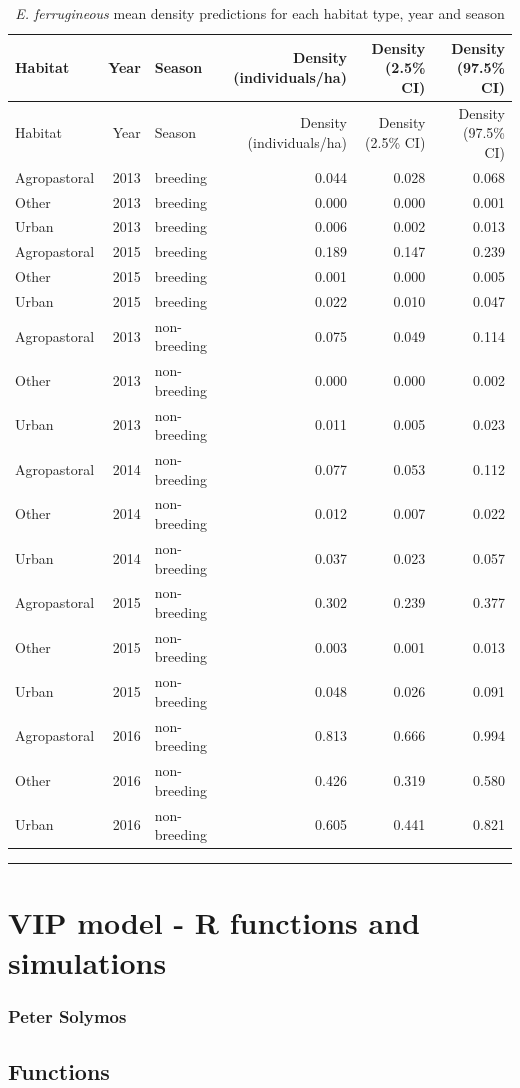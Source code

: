 \documentclass[]{article}
\begin{document}
\begin{longtable}[]{@{}lrlrrr@{}}
\caption{\textit{E. ferrugineous} mean density predictions for each
habitat type, year and season}\tabularnewline
\toprule
Habitat & Year & Season & Density (individuals/ha) & Density (2.5\% CI)
& Density (97.5\% CI)\tabularnewline
\midrule
\endfirsthead
\toprule
Habitat & Year & Season & Density (individuals/ha) & Density (2.5\% CI)
& Density (97.5\% CI)\tabularnewline
\midrule
\endhead
Agropastoral & 2013 & breeding & 0.044 & 0.028 & 0.068\tabularnewline
Other & 2013 & breeding & 0.000 & 0.000 & 0.001\tabularnewline
Urban & 2013 & breeding & 0.006 & 0.002 & 0.013\tabularnewline
Agropastoral & 2015 & breeding & 0.189 & 0.147 & 0.239\tabularnewline
Other & 2015 & breeding & 0.001 & 0.000 & 0.005\tabularnewline
Urban & 2015 & breeding & 0.022 & 0.010 & 0.047\tabularnewline
Agropastoral & 2013 & non-breeding & 0.075 & 0.049 &
0.114\tabularnewline
Other & 2013 & non-breeding & 0.000 & 0.000 & 0.002\tabularnewline
Urban & 2013 & non-breeding & 0.011 & 0.005 & 0.023\tabularnewline
Agropastoral & 2014 & non-breeding & 0.077 & 0.053 &
0.112\tabularnewline
Other & 2014 & non-breeding & 0.012 & 0.007 & 0.022\tabularnewline
Urban & 2014 & non-breeding & 0.037 & 0.023 & 0.057\tabularnewline
Agropastoral & 2015 & non-breeding & 0.302 & 0.239 &
0.377\tabularnewline
Other & 2015 & non-breeding & 0.003 & 0.001 & 0.013\tabularnewline
Urban & 2015 & non-breeding & 0.048 & 0.026 & 0.091\tabularnewline
Agropastoral & 2016 & non-breeding & 0.813 & 0.666 &
0.994\tabularnewline
Other & 2016 & non-breeding & 0.426 & 0.319 & 0.580\tabularnewline
Urban & 2016 & non-breeding & 0.605 & 0.441 & 0.821\tabularnewline
\bottomrule
\end{longtable}

\begin{center}\rule{0.5\linewidth}{\linethickness}\end{center}

\section{VIP model - R functions and
simulations}\label{vip-model---r-functions-and-simulations}

\subsubsection{Peter Solymos}\label{peter-solymos}

\subsection{Functions}\label{functions}
\end{document}
